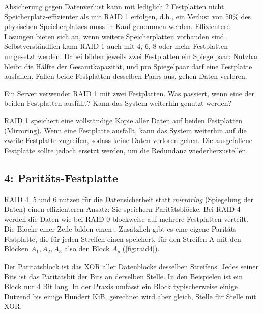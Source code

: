 Absicherung gegen Datenverlust kann mit lediglich 2 Festplatten nicht Speicherplatz-effizienter als mit \gls{RAID} 1 erfolgen, d.h., ein Verlust von 50\% des physischen Speicherplatzes muss in Kauf genommen werden. Effizientere Lösungen bieten sich an, wenn weitere Speicherplatten vorhanden sind. Selbstverständlich kann \gls{RAID} 1 auch mit 4, 6, 8 oder mehr Festplatten umgesetzt werden. Dabei bilden jeweils zwei Festplatten ein Spiegelpaar: Nutzbar bleibt die Hälfte der Gesamtkapazität, und pro Spiegelpaar darf eine Festplatte ausfallen. Fallen beide Festplatten desselben Paars aus, gehen Daten verloren.

\begin{myexercise}
    Ein Server verwendet \gls{RAID} 1 mit zwei Festplatten. Was passiert, wenn eine der beiden Festplatten ausfällt? Kann das System weiterhin genutzt werden?

    \begin{myanswer}
        \gls{RAID} 1 speichert eine vollständige Kopie aller Daten auf beiden Festplatten (Mirroring). Wenn eine Festplatte ausfällt, kann das System weiterhin auf die zweite Festplatte zugreifen, sodass keine Daten verloren gehen. Die ausgefallene Festplatte sollte jedoch ersetzt werden, um die Redundanz wiederherzustellen.
    \end{myanswer}
\end{myexercise}

\subsection{ 4: Paritäts-Festplatte}
\gls{RAID} 4, 5 und 6 nutzen für die Datensicherheit statt \textit{mirroring} (Spiegelung der Daten) einen effizienteren Ansatz: Sie speichern Paritätsblöcke. Bei \gls{RAID} 4 werden die Daten wie bei \gls{RAID} 0 blockweise auf mehrere Festplatten verteilt. Die Blöcke einer Zeile bilden einen . Zusätzlich gibt es eine eigene Paritäts-Festplatte, die für jeden Streifen einen  speichert, für den Streifen A mit den Blöcken $A_1, A_2, A_3$ also den Block $A_p$ (\cref{fig:raid4}).

Der Paritätsblock ist das \acrshort{XOR} aller Datenblöcke desselben Streifens. Jedes seiner Bits ist das Paritätsbit der Bits an derselben Stelle. In den Beispielen ist ein Block nur 4 Bit lang. In der Praxis umfasst ein Block typischerweise einige Dutzend bis einige Hundert KiB, gerechnet wird aber gleich, Stelle für Stelle mit \acrshort{XOR}.

